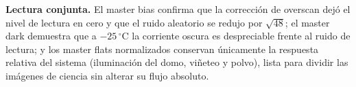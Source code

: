 \documentclass[10pt,a4paper]{article}
\begin{document}
\noindent\textbf{Lectura conjunta.} El master bias confirma que la corrección
de overscan dejó el nivel de lectura en cero y que el ruido aleatorio se
redujo por $\sqrt{48}$; el master dark demuestra que a $-25\,^{\circ}$C la
corriente oscura es despreciable frente al ruido de lectura; y los master
flats normalizados conservan únicamente la respuesta relativa del sistema
(iluminación del domo, viñeteo y polvo), lista para dividir las imágenes de
ciencia sin alterar su flujo absoluto.
\end{document}
